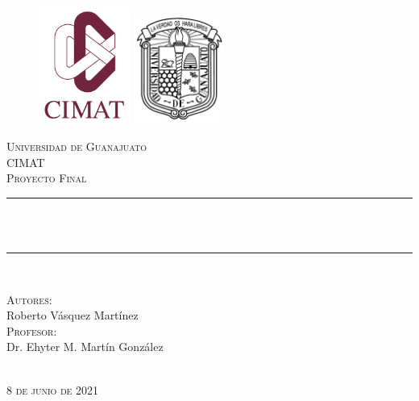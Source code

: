 \documentclass[12pt,oneside]{book}
\author{Roberto Vásquez Martínez}
\numberwithin{equation}{chapter}
\begin{document}
\begin{titlepage}
	\centering
    \vspace*{0.0 cm}
    \begin{figure}[h!]\centering
        \begin{minipage}{0.4\textwidth}
            \includegraphics[width= 3cm]{logo_Cimat.png}            
        \end{minipage}\hfill
        \begin{minipage}{0.20\textwidth}
            \includegraphics[width= 3cm]{logoUG.png}
        \end{minipage}
    \end{figure}
    \textsc{\LARGE Universidad de Guanajuato}\\[0.3 cm]
    \textsc{\LARGE CIMAT}\\[2.0 cm]	%
	\textsc{\Large Proyecto Final}\\[0.5 cm]
    {\color{coolred}
	\rule{\linewidth}{0.2 mm}} \\[0.4 cm]
	{ \huge \bfseries \color{mytitlecolor}{Teorema de Donsker}}\\
    {\color{coolred}
	\rule{\linewidth}{0.2 mm}} \\[1.5 cm]
	
	\begin{minipage}{0.4\textwidth}
		\begin{center} \large
			\textsc{Autores:}\\[0.25 cm]
			Roberto Vásquez Martínez\\ [1.0 cm]
			\textsc{Profesor:}\\[0.25 cm]
			Dr. Ehyter M. Martín González
			\end{center}
	\end{minipage}\\[2 cm]
	{\normalsize \textsc{8 de junio de 2021}
    }\\[2 cm]
	\vfill
\end{titlepage}
\end{document}
